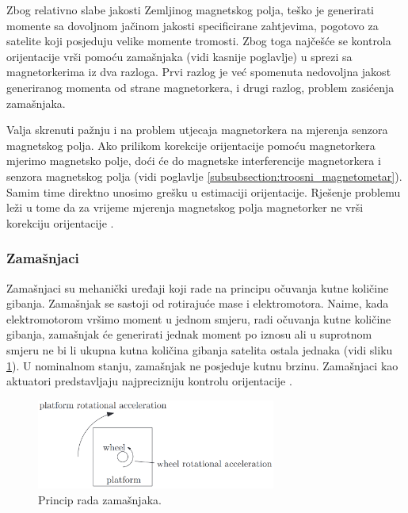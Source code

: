 \documentclass[times, utf8, diplomski, numeric]{templates/template}
\begin{document}
{{{{                Zbog relativno slabe jakosti Zemljinog magnetskog polja, teško je generirati momente sa dovoljnom jačinom jakosti specificirane zahtjevima, pogotovo za satelite koji posjeduju velike momente tromosti. Zbog toga najčešće se kontrola orijentacije vrši pomoću zamašnjaka (vidi kasnije poglavlje) u sprezi sa magnetorkerima iz dva razloga. Prvi razlog je već spomenuta nedovoljna jakost generiranog momenta od strane magnetorkera, i drugi razlog, problem zasićenja zamašnjaka.

                Valja skrenuti pažnju i na problem utjecaja magnetorkera na mjerenja senzora magnetskog polja. Ako prilikom korekcije orijentacije pomoću magnetorkera mjerimo magnetsko polje, doći će do magnetske interferencije magnetorkera i senzora magnetskog polja (vidi poglavlje \ref{subsubsection:troosni_magnetometar}). Samim time direktno unosimo grešku u estimaciji orijentacije. Rješenje problemu leži u tome da za vrijeme mjerenja magnetskog polja magnetorker ne vrši korekciju orijentacije \cite{adcsKnjiga}. 
            }

            \subsubsection{Zamašnjaci }{
                Zamašnjaci su mehanički uređaji koji rade na principu očuvanja kutne količine gibanja. Zamašnjak se sastoji od rotirajuće mase i elektromotora. Naime, kada elektromotorom vršimo moment u jednom smjeru, radi očuvanja kutne količine gibanja, zamašnjak će generirati jednak moment po iznosu ali u suprotnom smjeru ne bi li ukupna kutna količina gibanja satelita ostala jednaka (vidi sliku \ref{fig:zamasnjak_fig}). U nominalnom stanju, zamašnjak ne posjeduje kutnu brzinu. Zamašnjaci kao aktuatori predstavljaju najprecizniju kontrolu orijentacije \cite{adcsKnjiga}.

                \begin{figure}[htb]
                \centering
                \includegraphics[width=0.7\textwidth]{images/zamasnjak.png}
                \caption{Princip rada zamašnjaka.}
                \label{fig:zamasnjak_fig}
                \end{figure}

}}}}
\end{document}
